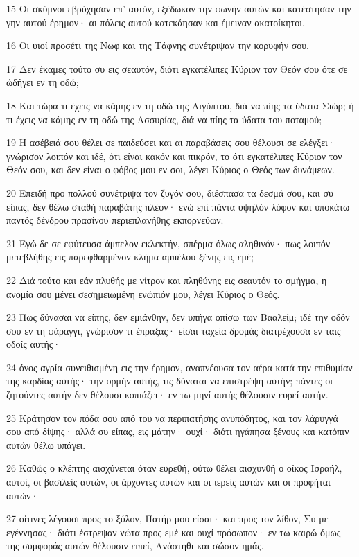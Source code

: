 \par 15 Οι σκύμνοι εβρύχησαν επ' αυτόν, εξέδωκαν την φωνήν αυτών και κατέστησαν την γην αυτού έρημον· αι πόλεις αυτού κατεκάησαν και έμειναν ακατοίκητοι.
\par 16 Οι υιοί προσέτι της Νωφ και της Τάφνης συνέτριψαν την κορυφήν σου.
\par 17 Δεν έκαμες τούτο συ εις σεαυτόν, διότι εγκατέλιπες Κύριον τον Θεόν σου ότε σε ώδήγει εν τη οδώ;
\par 18 Και τώρα τι έχεις να κάμης εν τη οδώ της Αιγύπτου, διά να πίης τα ύδατα Σιώρ; ή τι έχεις να κάμης εν τη οδώ της Ασσυρίας, διά να πίης τα ύδατα του ποταμού;
\par 19 Η ασέβειά σου θέλει σε παιδεύσει και αι παραβάσεις σου θέλουσι σε ελέγξει· γνώρισον λοιπόν και ιδέ, ότι είναι κακόν και πικρόν, το ότι εγκατέλιπες Κύριον τον Θεόν σου, και δεν είναι ο φόβος μου εν σοι, λέγει Κύριος ο Θεός των δυνάμεων.
\par 20 Επειδή προ πολλού συνέτριψα τον ζυγόν σου, διέσπασα τα δεσμά σου, και συ είπας, δεν θέλω σταθή παραβάτης πλέον· ενώ επί πάντα υψηλόν λόφον και υποκάτω παντός δένδρου πρασίνου περιεπλανήθης εκπορνεύων.
\par 21 Εγώ δε σε εφύτευσα άμπελον εκλεκτήν, σπέρμα όλως αληθινόν· πως λοιπόν μετεβλήθης εις παρεφθαρμένον κλήμα αμπέλου ξένης εις εμέ;
\par 22 Διά τούτο και εάν πλυθής με νίτρον και πληθύνης εις σεαυτόν το σμήγμα, η ανομία σου μένει σεσημειωμένη ενώπιόν μου, λέγει Κύριος ο Θεός.
\par 23 Πως δύνασαι να είπης, δεν εμιάνθην, δεν υπήγα οπίσω των Βααλείμ; ιδέ την οδόν σου εν τη φάραγγι, γνώρισον τι έπραξας· είσαι ταχεία δρομάς διατρέχουσα εν ταις οδοίς αυτής·
\par 24 όνος αγρία συνειθισμένη εις την έρημον, αναπνέουσα τον αέρα κατά την επιθυμίαν της καρδίας αυτής· την ορμήν αυτής, τις δύναται να επιστρέψη αυτήν; πάντες οι ζητούντες αυτήν δεν θέλουσι κοπιάζει· εν τω μηνί αυτής θέλουσιν ευρεί αυτήν.
\par 25 Κράτησον τον πόδα σου από του να περιπατήσης ανυπόδητος, και τον λάρυγγά σου από δίψης· αλλά συ είπας, εις μάτην· ουχί· διότι ηγάπησα ξένους και κατόπιν αυτών θέλω υπάγει.
\par 26 Καθώς ο κλέπτης αισχύνεται όταν ευρεθή, ούτω θέλει αισχυνθή ο οίκος Ισραήλ, αυτοί, οι βασιλείς αυτών, οι άρχοντες αυτών και οι ιερείς αυτών και οι προφήται αυτών·
\par 27 οίτινες λέγουσι προς το ξύλον, Πατήρ μου είσαι· και προς τον λίθον, Συ με εγέννησας· διότι έστρεψαν νώτα προς εμέ και ουχί πρόσωπον· εν τω καιρώ όμως της συμφοράς αυτών θέλουσιν ειπεί, Ανάστηθι και σώσον ημάς.
